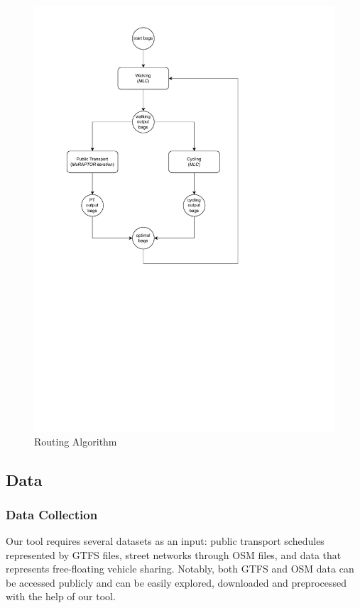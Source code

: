 \begin{figure}
    \centering
    \includegraphics[scale=0.75]{Figures/method/routing_algorithm}
    \caption{Routing Algorithm}
    \label{fig:routing_algorithm}
\end{figure}

\subsection{Data}
\label{subs:data}

\subsubsection{Data Collection}
\label{subs:data_collection}

Our tool requires several datasets as an input: public transport schedules represented by GTFS files, street networks through OSM files, and data that represents free-floating vehicle sharing.
Notably, both GTFS and OSM data can be accessed publicly and can be easily explored, downloaded and preprocessed with the help of our tool.

